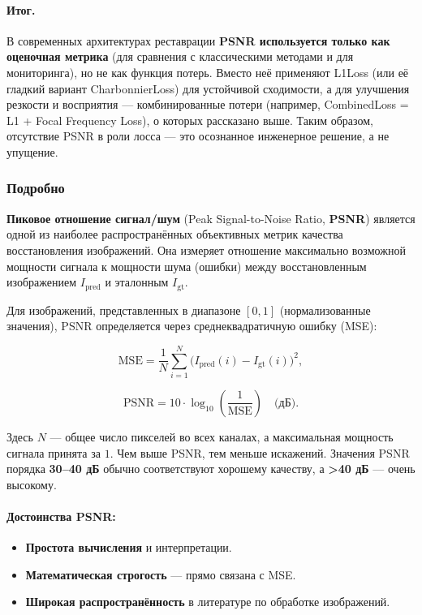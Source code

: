 \documentclass[12pt,a4paper]{article}
\begin{document}
\paragraph{Итог.}
В современных архитектурах реставрации \textbf{PSNR используется только как оценочная метрика} (для сравнения с классическими методами и для мониторинга), но не как функция потерь. Вместо неё применяют L1Loss (или её гладкий вариант CharbonnierLoss) для устойчивой сходимости, а для улучшения резкости и восприятия — комбинированные потери (например, CombinedLoss = L1 + Focal Frequency Loss), о которых рассказано выше. Таким образом, отсутствие PSNR в роли лосса — это осознанное инженерное решение, а не упущение.

\subsubsection{Подробно}

\textbf{Пиковое отношение сигнал/шум} (Peak Signal-to-Noise Ratio, \textbf{PSNR}) является одной из наиболее распространённых объективных метрик качества восстановления изображений. Она измеряет отношение максимально возможной мощности сигнала к мощности шума (ошибки) между восстановленным изображением \(I_{\text{pred}}\) и эталонным \(I_{\text{gt}}\).

Для изображений, представленных в диапазоне \([0,1]\) (нормализованные значения), PSNR определяется через среднеквадратичную ошибку (MSE):

\[
\text{MSE} = \frac{1}{N}\sum_{i=1}^{N}\bigl(I_{\text{pred}}(i) - I_{\text{gt}}(i)\bigr)^2,
\]

\[
\text{PSNR} = 10 \cdot \log_{10}\left(\frac{1}{\text{MSE}}\right) \quad \text{(дБ)}.
\]

Здесь \(N\) — общее число пикселей во всех каналах, а максимальная мощность сигнала принята за \(1\). Чем выше PSNR, тем меньше искажений. Значения PSNR порядка \textbf{30–40 дБ} обычно соответствуют хорошему качеству, а \textbf{>40 дБ} — очень высокому.

\paragraph{Достоинства PSNR:}
\begin{itemize}
    \item \textbf{Простота вычисления} и интерпретации.
    \item \textbf{Математическая строгость} — прямо связана с MSE.
    \item \textbf{Широкая распространённость} в литературе по обработке изображений.
\end{itemize}
\end{document}
